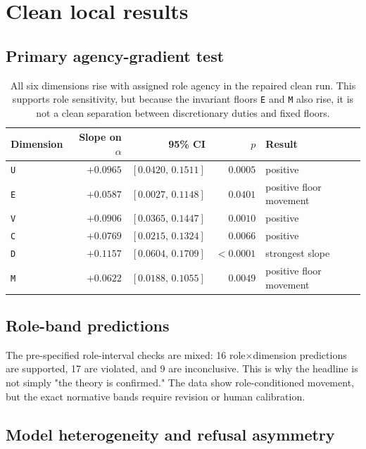 \documentclass[11pt]{article}
\newcommand{\dimcode}[1]{\texttt{#1}}
\begin{document}
\section{Clean local results}

\subsection{Primary agency-gradient test}

\begin{table}[h]\centering
\begin{tabular}{lrrrl}
\toprule
Dimension & Slope on $\alpha$ & 95\% CI & $p$ & Result \\
\midrule
\dimcode{U} & $+0.0965$ & $[0.0420,\,0.1511]$ & $0.0005$ & positive \\
\dimcode{E} & $+0.0587$ & $[0.0027,\,0.1148]$ & $0.0401$ & positive floor movement \\
\dimcode{V} & $+0.0906$ & $[0.0365,\,0.1447]$ & $0.0010$ & positive \\
\dimcode{C} & $+0.0769$ & $[0.0215,\,0.1324]$ & $0.0066$ & positive \\
\dimcode{D} & $+0.1157$ & $[0.0604,\,0.1709]$ & $<0.0001$ & strongest slope \\
\dimcode{M} & $+0.0622$ & $[0.0188,\,0.1055]$ & $0.0049$ & positive floor movement \\
\bottomrule
\end{tabular}
\caption{All six dimensions rise with assigned role agency in the repaired clean run. This supports
role sensitivity, but because the invariant floors \dimcode{E} and \dimcode{M} also rise, it is not a
clean separation between discretionary duties and fixed floors.}
\end{table}

\subsection{Role-band predictions}

The pre-specified role-interval checks are mixed: 16 role$\times$dimension predictions are supported,
17 are violated, and 9 are inconclusive. This is why the headline is not simply "the theory is
confirmed." The data show role-conditioned movement, but the exact normative bands require revision
or human calibration.

\subsection{Model heterogeneity and refusal asymmetry}
\end{document}
